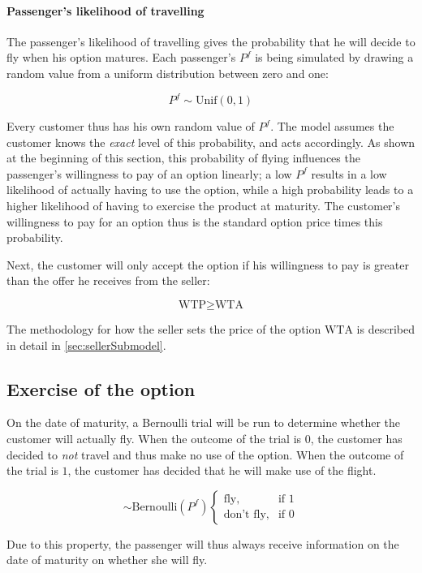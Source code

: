 \paragraph{Passenger's likelihood of travelling}
The passenger's likelihood of travelling gives the probability that he will decide to fly when his option matures. Each passenger's $P^f$ is being simulated by drawing a random value from a uniform distribution between zero and one:

$$ P^f \sim \mbox{Unif}(0, 1)$$

Every customer thus has his own random value of $P^f$. The model assumes the customer knows the \emph{exact} level of this probability, and acts accordingly. As shown at the beginning of this section, this probability of flying influences the passenger's willingness to pay of an option linearly; a low $P^f$ results in a low likelihood of actually having to use the option, while a high probability leads to a higher likelihood of having to exercise the product at maturity. The customer's willingness to pay for an option thus is the standard option price times this probability.

Next, the customer will only accept the option if his willingness to pay is greater than the offer he receives from the seller:

$$ \mbox{WTP} \ge \mbox{WTA} $$

The methodology for how the seller sets the price of the option $\mbox{WTA}$ is described in detail in \autoref{sec:sellerSubmodel}.


\subsection{Exercise of the option}
On the date of maturity, a Bernoulli trial will be run to determine whether the customer will actually fly. When the outcome of the trial is $0$, the customer has decided to \emph{not} travel and thus make no use of the option. When the outcome of the trial is $1$, the customer has decided that he will make use of the flight.

\begin{equation}
\sim \mbox{Bernoulli}(P^f)\begin{cases}
     \mbox{fly}, & \mbox{if } 1 \\
    \mbox{don't fly}, & \mbox{if } 0 \end{cases}
\end{equation}

Due to this property, the passenger will thus always receive information on the date of maturity on whether she will fly.

